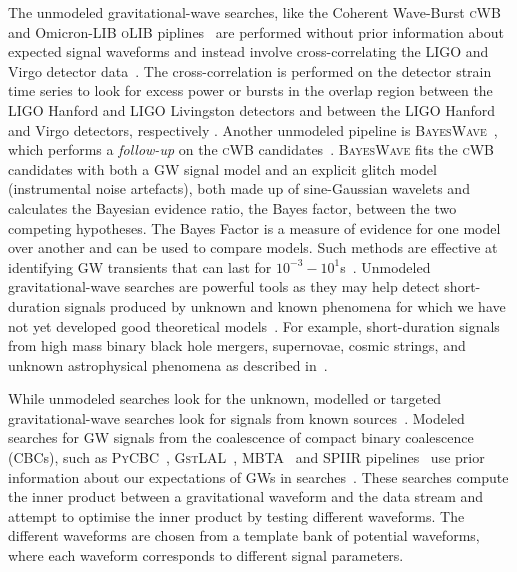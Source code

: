 The unmodeled gravitational-wave searches, like the Coherent Wave-Burst \textsc{cWB}~\cite{cWB_search} and Omicron-LIB \textsc{oLIB} piplines~\cite{oLIB} are performed without prior information about expected signal waveforms and instead involve cross-correlating the LIGO and Virgo detector data~\cite{gw_search_review}.
The cross-correlation is performed on the detector strain time series to look for excess power or bursts in the overlap region between the LIGO Hanford and LIGO Livingston detectors and between the LIGO Hanford and Virgo detectors, respectively \cite{gw_search_review}. 
Another unmodeled pipeline is \textsc{BayesWave}~\cite{Cornish:2015:CQGra}, which performs a \textit{follow-up} on the \textsc{cWB} candidates~\cite{bayeswave_as_followup, abbott2019all}. 
\textsc{BayesWave} fits the \textsc{cWB} candidates with both a GW signal model and an explicit glitch model (instrumental noise artefacts), both made up of sine-Gaussian wavelets and calculates the Bayesian evidence ratio, the Bayes factor, between the two competing hypotheses. 
The Bayes Factor is a measure of evidence for one model over another and can be used to compare models.
Such methods are effective at identifying GW transients that can last for
$10^{-3}-10^{1}$s~\cite{abbott2016observing}. 
Unmodeled gravitational-wave searches are powerful tools as they may help detect short-duration signals produced by unknown and known phenomena for which we have not yet developed good theoretical models~\cite{gw_search_review}. 
For example, short-duration signals from high mass binary black hole mergers, supernovae, cosmic strings, and unknown astrophysical phenomena as described in~\citep{abbott2018prospects}.

While unmodeled searches look for the unknown,  modelled or targeted gravitational-wave searches look for signals from known sources~\cite{abbott2016ligo}. 
Modeled searches for GW signals from the coalescence of compact binary coalescence (CBCs), such as \textsc{PyCBC}~\cite{biwer2019pycbc},
\textsc{GstLAL}~\cite{sachdev2019gstlal}, \textsc{MBTA}~\cite{MBTA} and \textsc{SPIIR} pipelines~\cite{SPIIR} use prior information about our expectations of GWs in searches~\cite{gw_search_review}. 
These searches compute the inner product between a gravitational waveform and the data stream and attempt to optimise the inner product by testing different waveforms. 
The different waveforms are chosen from a template bank of potential waveforms, where each waveform corresponds to different signal parameters. 

